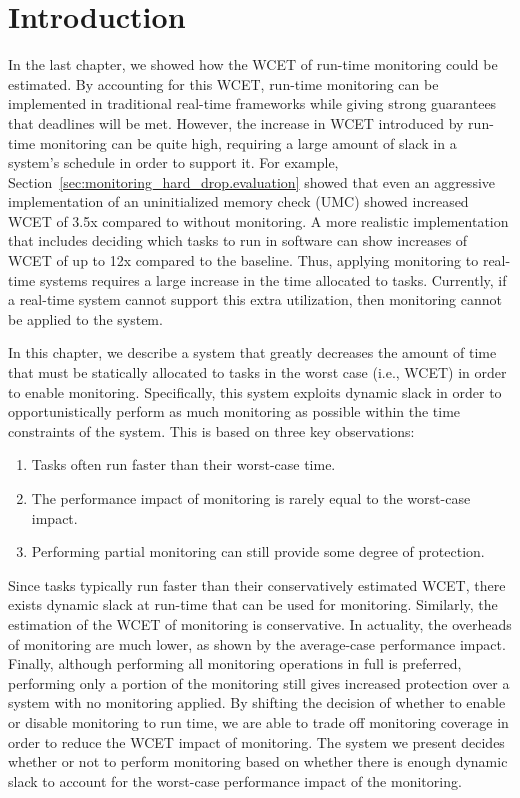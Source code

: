\section{Introduction}
\label{sec:monitoring_hard_drop.introduction}

In the last chapter, we showed how the WCET of run-time monitoring could be
estimated. By accounting for this WCET, run-time monitoring can be
implemented in traditional real-time frameworks while giving strong guarantees
that deadlines will be met. However, the increase in WCET introduced by
run-time monitoring can be quite high, requiring a large amount of slack in a
system's schedule in order to support it. For example,
Section~\ref{sec:monitoring_hard_drop.evaluation} showed that even an
aggressive implementation of an uninitialized memory check (UMC) showed increased WCET of 3.5x compared to
without monitoring. A more realistic implementation that includes deciding
which tasks to run in software can show increases of WCET of up to 12x compared
to the baseline.  Thus, applying monitoring to real-time systems requires a
large increase in the time allocated to tasks.  Currently, if a real-time
system cannot support this extra utilization, then monitoring cannot be applied
to the system.  

In this chapter, we describe a system that greatly decreases the amount of time
that must be statically allocated to tasks in the worst case (i.e., WCET) in
order to enable monitoring. Specifically, this system exploits dynamic slack in
order to opportunistically perform as much monitoring as possible within the
time constraints of the system. This is based on three key observations:
\begin{enumerate}
  \item Tasks often run faster than their worst-case time.
  \item The performance impact of monitoring is rarely equal to the worst-case impact.
  \item Performing partial monitoring can still provide some degree of protection.
\end{enumerate}
Since tasks typically run faster than their conservatively estimated WCET,
there exists dynamic slack at run-time that can be used for monitoring.
Similarly, the estimation of the WCET of monitoring is conservative. In
actuality, the overheads of monitoring are much lower, as shown by the
average-case performance impact. Finally, although performing all monitoring
operations in full is preferred, performing only a portion of the monitoring
still gives increased protection over a system with no monitoring applied.
By shifting the decision of whether to enable or disable monitoring to
run time, we are able to trade off monitoring coverage in order to reduce the
WCET impact of monitoring. The system we present decides whether or not to
perform monitoring based on whether there is enough dynamic slack to account
for the worst-case performance impact of the monitoring.

